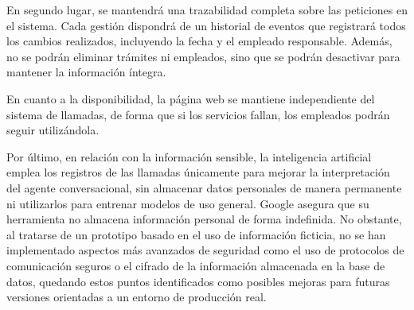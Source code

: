     En segundo lugar, se mantendrá una trazabilidad completa sobre las peticiones en el sistema. 
    Cada gestión dispondrá de un historial de eventos que registrará todos los cambios realizados, incluyendo la fecha y el empleado responsable. 
    Además, no se podrán eliminar trámites ni empleados, sino que se podrán desactivar para mantener la información íntegra.

    En cuanto a la disponibilidad, la página web se mantiene independiente del sistema de llamadas, de forma que si los servicios fallan, los empleados podrán seguir utilizándola.

    Por último, en relación con la información sensible, la inteligencia artificial emplea los registros de las llamadas únicamente para mejorar la interpretación del agente conversacional, sin almacenar datos personales de manera permanente ni utilizarlos para entrenar modelos de uso general. 
    Google asegura que su herramienta no almacena información personal de forma indefinida. 
    No obstante, al tratarse de un prototipo basado en el uso de información ficticia, no se han implementado aspectos más avanzados de seguridad como el uso de protocolos de comunicación seguros o el cifrado de la información almacenada en la base de datos, quedando estos puntos identificados como posibles mejoras para futuras versiones orientadas a un entorno de producción real.